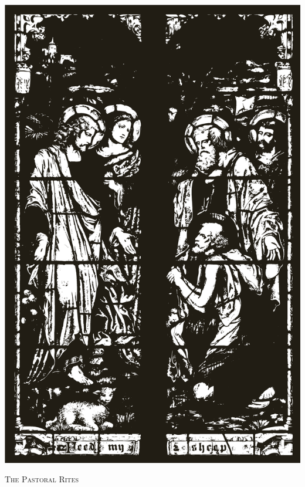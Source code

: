   \begin{center}
   \includegraphics[scale=.25]{PFMS2.eps}
   \par
   \vspace{4ex}
   	\textsc{\Huge{The Pastoral Rites}}
   \end{center}